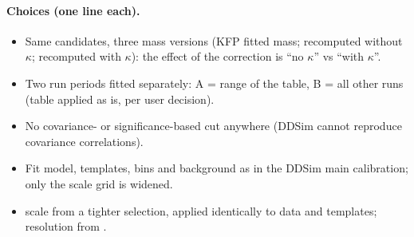 \paragraph{Choices (one line each).}
\begin{itemize}
\item Same candidates, three mass versions (KFP fitted mass; recomputed without $\kappa$; recomputed with $\kappa$): the
  effect of the correction is ``no $\kappa$'' vs ``with $\kappa$''.
\item Two run periods fitted separately: A = range of the table, B = all other runs (table applied as is, per user decision).
\item No covariance- or significance-based cut anywhere (DDSim cannot reproduce covariance correlations).
\item Fit model, templates, bins and background as in the DDSim main calibration; only the scale grid is widened.
\item \La{} scale from a tighter \La{} selection, applied identically to data and templates; resolution from \Ks.
\end{itemize}
